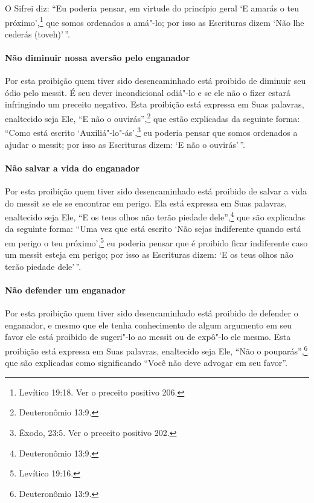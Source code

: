 \begin{multicols}{2}
O Sifrei\starr{} diz: ``Eu poderia pensar, em virtude do princípio geral `E
amarás o teu próximo',\footnote{Levítico 19:18. Ver o preceito positivo 206.} que somos
ordenados a amá"-lo; por isso as Escrituras dizem `Não lhe cederás
(toveh)'\,''.

\paragraph{Não diminuir nossa aversão pelo enganador}

Por esta proibição quem tiver sido desencaminhado está proibido de
diminuir seu ódio pelo messit\starr. É seu dever incondicional odiá"-lo e
se ele não o fizer estará infringindo um preceito negativo. Esta
proibição está expressa em Suas palavras, enaltecido seja Ele, ``E não
o ouvirás'',\footnote{Deuteronômio 13:9.} que estão explicadas da seguinte forma:
``Como está escrito `Auxiliá"-lo"-ás',\footnote{Êxodo, 23:5. Ver o preceito positivo 202.} eu poderia pensar que somos ordenados a ajudar o messit\starr; por isso as Escrituras dizem: `E não o ouvirás'\,''.

\paragraph{Não salvar a vida do enganador}

Por esta proibição quem tiver sido desencaminhado está proibido de
salvar a vida do messit\starr{} se ele se encontrar em perigo. Ela está
expressa em Suas palavras, enaltecido seja Ele, ``E os teus olhos não
terão piedade dele'',\footnote{Deuteronômio 13:9.} que são explicadas da seguinte
forma: ``Uma vez que está escrito `Não sejas indiferente quando está em
perigo o teu próximo',\footnote{Levítico 19:16.} eu poderia pensar que é
proibido ficar indiferente caso um messit\starr{} esteja em perigo; por isso
as Escrituras dizem: `E os teus olhos não terão piedade dele'\,''.

\paragraph{Não defender um enganador}

Por esta proibição quem tiver sido desencaminhado está proibido de
defender o enganador, e mesmo que ele tenha conhecimento de algum
argumento em seu favor ele está proibido de sugeri"-lo ao messit\starr{} ou
de expô"-lo ele mesmo. Esta proibição está expressa em Suas palavras,
enaltecido seja Ele, ``Não o pouparás'',\footnote{Deuteronômio 13:9.} que são
explicadas como significando ``Você não deve advogar em seu favor''.


\end{multicols}
